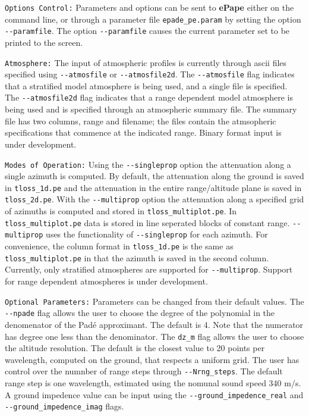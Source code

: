 \verb+Options Control:+ Parameters and options can be sent to {\bf ePape} either on the command line, or through a parameter file \verb+epade_pe.param+ by setting the option \verb+--paramfile+. The option \verb+--paramfile+ causes the current parameter set to be printed to the screen. 

\verb+Atmosphere:+ The input of atmospheric profiles is currently through ascii files specified using \verb+--atmosfile+ or \verb+--atmosfile2d+. The \verb+--atmosfile+ flag indicates that a stratified model atmosphere is being used, and a single file is specified. The \verb+--atmosfile2d+ flag indicates that a range dependent model atmosphere is being used and is specified through an atmospheric summary file. The summary file has two columns, range and filename; the files contain the atmsopheric specifications that commence at the indicated range. Binary format input is under development.
 
\verb+Modes of Operation:+ Using the \verb+--singleprop+ option the attenuation along a single azimuth is computed. By default, the attenuation along the ground is saved in \verb+tloss_1d.pe+ and the attenuation in the entire range/altitude plane is saved in \verb+tloss_2d.pe+. With the \verb+--multiprop+ option the attenuation along a specified grid of azimuths is computed and stored in \verb+tloss_multiplot.pe+. In \verb+tloss_multiplot.pe+ data is stored in line seperated blocks of constant range. \verb+--multiprop+ uses the functionality of \verb+--singleprop+ for each azimuth. For convenience, the column format in \verb+tloss_1d.pe+ is the same as \verb+tloss_multiplot.pe+ in that the azimuth is saved in the second column. Currently, only stratified atmospheres are supported for \verb+--multiprop+. Support for range dependent atmospheres is under development. 

\verb+Optional Parameters:+ Parameters can be changed from their default values. The \verb+--npade+ flag allows the user to choose the degree of the polynomial in the denomenator of the Pad\'e approximant. The default is 4. Note that the numerator has degree one less than the denominator. The \verb+dz_m+ flag allows the user to choose the altitude resolution. The default is the closest value to 20 points per wavelength, computed on the ground, that respects a uniform grid. The user has control over the numnber of range steps through \verb+--Nrng_steps+. The default range step is one wavelength, estimated using the nomunal sound speed 340 m/s. A ground impedence value can be input using the \verb+--ground_impedence_real+ and \verb+--ground_impedence_imag+ flags. 


